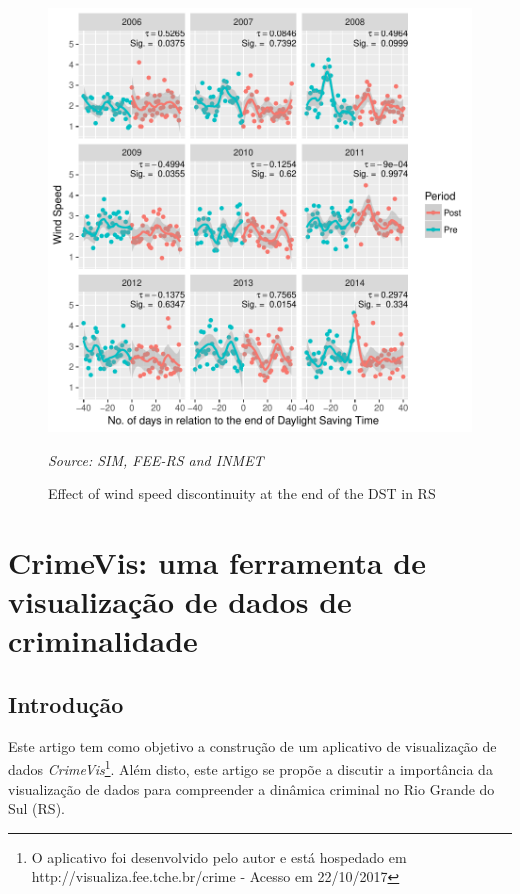 \documentclass[12pt,openright,oneside,a4paper,english,french,spanish]{abntex2}
\numberwithin{table}{section} %
\numberwithin{figure}{section} %
\newcommand{\source}[1]{\textit{#1}}
\begin{document}
\begin{otherlanguage}{english}
\begin{subappendices}
\begin{figure}[H]
\begin{center}
\includegraphics{TESE_DE_DOUTORADO_RENAN_FINAL-plot_efeito_descontinuo_velocidade_saida}
\end{center}
\caption{Effect of wind speed discontinuity at the end of the DST in RS}
\source{Source: SIM, FEE-RS and INMET}
\label{fig:efeito_descon_velo_saida_RS}
\end{figure}



\end{subappendices}

\end{otherlanguage}





\chapter{CrimeVis: uma ferramenta de visualização de dados de criminalidade}

\section{Introdução\label{sec:Introducao_CrimeVis}}

Este artigo tem como objetivo a construção de um aplicativo de visualização de dados \textit{CrimeVis}\footnote{O aplicativo foi desenvolvido pelo autor e está hospedado em http://visualiza.fee.tche.br/crime - Acesso em 22/10/2017}. Além disto, este artigo se propõe a discutir a importância da visualização de dados para compreender a dinâmica criminal no Rio Grande do Sul (RS).
\end{document}
